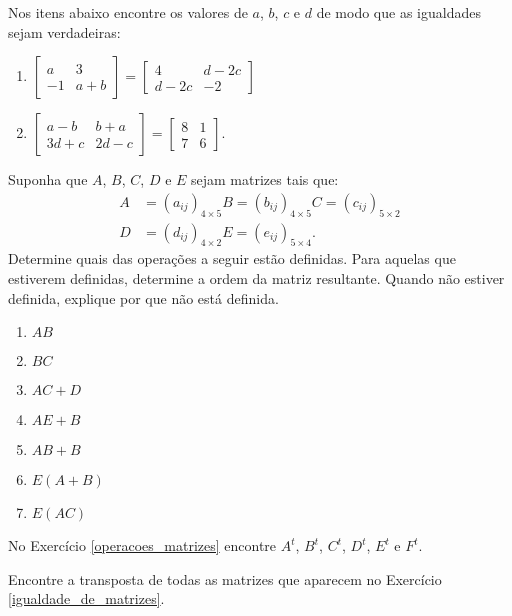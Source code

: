 \documentclass[12pt]{exam}
\begin{document}
    \questao{}\label{igualdade_de_matrizes} Nos itens abaixo encontre os valores de $a$, $b$, $c$ e $d$ de modo que as igualdades sejam verdadeiras:
    \begin{enumerate}
        \item $\begin{bmatrix}a & 3\\-1 & a + b\end{bmatrix} = \begin{bmatrix}4 & d - 2c\\d - 2c & -2\end{bmatrix}$
        \item $\begin{bmatrix}a - b & b + a\\3d + c & 2d - c\end{bmatrix} = \begin{bmatrix}8 & 1\\7 & 6\end{bmatrix}$.
    \end{enumerate}

    \vspace{.3cm}

    \questao{} Suponha que $A$, $B$, $C$, $D$ e $E$ sejam matrizes tais que:
    \begin{align*}
        A &= (a_{ij})_{4 \times 5}
        B = (b_{ij})_{4 \times 5}
        C = (c_{ij})_{5 \times 2}\\
        D &= (d_{ij})_{4 \times 2}
        E = (e_{ij})_{5 \times 4}.
    \end{align*}
    Determine quais das operações a seguir estão definidas. Para aquelas que estiverem definidas, determine a ordem da matriz resultante. Quando não estiver definida, explique por que não está definida.
    \begin{multicols}{2}
        \begin{enumerate}[label={\arabic*})]
            \item $AB$

            \item $BC$

            \item $AC + D$

            \item $AE + B$

            \item $AB + B$

            \item $E(A + B)$

            \item $E(AC)$

        \end{enumerate}
    \end{multicols}

    \vspace{.3cm}

    \questao{} No Exercício \ref{operacoes_matrizes} encontre $A^t$, $B^t$, $C^t$, $D^t$, $E^t$ e $F^t$.

    \vspace{.3cm}

    \questao{} Encontre a transposta de todas as matrizes que aparecem no Exercício \ref{igualdade_de_matrizes}.
\end{document}
